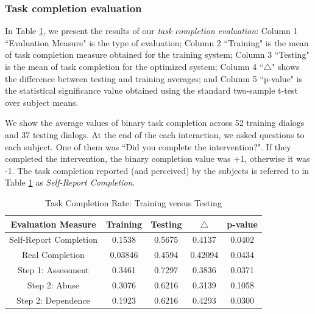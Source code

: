 \begin{sloppy}
\subsubsection{Task completion evaluation} 
In Table \ref{taskcompletion}, we present the results of our {\em task completion evaluation}: Column 1 ``Evaluation Measure" is the type of evaluation; Column 2 ``Training" is the mean of task completion measure obtained for the training system; Column 3 ``Testing" is the mean of task completion for the optimized system; Column 4 ``$\triangle$" shows the difference between testing and training averages; and Column 5 ``p-value" is the statistical significance value obtained using the standard two-sample t-test over subject means.

We show the average values of binary task completion across 52 training dialogs and 37 testing dialogs. At the end of the each interaction, we asked questions to each subject. One of them was ``Did you complete the intervention?". If they completed the intervention, the binary completion value was +1, otherwise it was -1. The task completion reported (and perceived) by the subjects is referred to in Table \ref{taskcompletion} as \textit{Self-Report Completion}. 

\begin{table}
\caption{Task Completion Rate: Training versus Testing}
\label{taskcompletion}
 \begin{tabular}{ | c | c | c | c | c | }
    \hline
    Evaluation Measure & Training & Testing & $\triangle$ & p-value \\ \hline
    Self-Report Completion & 0.1538 & 0.5675
      & 0.4137 & 0.0402  \\ \hline
    Real Completion & 0.03846 & 0.4594 & 0.42094 & 0.0434 \\ \hline
    Step 1: Assessment & 0.3461 & 0.7297 & 0.3836 & 0.0371 \\ \hline
    Step 2: Abuse & 0.3076
      & 0.6216
       & 0.3139 & 0.1058 \\
    \hline
    Step 2: Dependence & 0.1923 & 0.6216 & 0.4293 & 0.0300 \\ \hline
    \end{tabular}

    \end{table} 


\end{sloppy}
